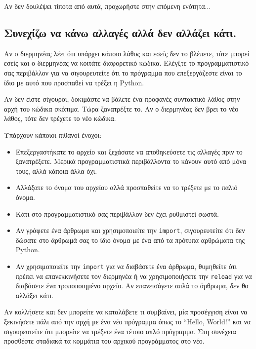 \documentclass[10pt]{book}
\begin{document}
Αν δεν δουλέψει τίποτα από αυτά, προχωρήστε στην επόμενη ενότητα...


\subsection{Συνεχίζω να κάνω αλλαγές αλλά δεν αλλάζει κάτι.}

Αν ο διερμηνέας λέει ότι υπάρχει κάποιο λάθος και εσείς δεν το βλέπετε, τότε μπορεί εσείς και 
ο διερμηνέας να κοιτάτε διαφορετικό κώδικα.  Ελέγξτε το προγραμματιστικό σας περιβάλλον για να
σιγουρευτείτε ότι το πρόγραμμα που επεξεργάζεστε είναι το ίδιο με αυτό που προσπαθεί να τρέξει 
η Python.

Αν δεν είστε σίγουροι, δοκιμάστε να βάλετε ένα προφανές συντακτικό λάθος στην αρχή του 
κώδικα σκόπιμα.  Τώρα ξανατρέξτε το.  Αν ο διερμηνέας δεν βρει το νέο λάθος, τότε δεν τρέχετε 
το νέο κώδικα.

Υπάρχουν κάποιοι πιθανοί ένοχοι:

\begin{itemize}

\item  Επεξεργαστήκατε το αρχείο και ξεχάσατε να αποθηκεύσετε τις αλλαγές πριν το ξανατρέξετε.
Μερικά προγραμματιστικά περιβάλλοντα το κάνουν αυτό από μόνα τους, αλλά κάποια άλλα όχι. 

\item  Αλλάξατε το όνομα του αρχείου αλλά προσπαθείτε να το τρέξετε με το παλιό όνομα. 

\item  Κάτι στο προγραμματιστικό σας περιβάλλον δεν έχει ρυθμιστεί σωστά. 

\item  Αν γράφετε ένα άρθρωμα και χρησιμοποιείτε την {\tt import}, σιγουρευτείτε 
ότι δεν δώσατε στο άρθρωμά σας το ίδιο όνομα με ένα από τα πρότυπα αρθρώματα της Python.

\item  Αν χρησιμοποιείτε την {\tt import} για να διαβάσετε ένα άρθρωμα, θυμηθείτε 
ότι πρέπει να επανεκκινήσετε τον διερμηνέα ή να χρησιμοποιήσετε την {\tt reload} για να 
διαβάσετε ένα τροποποιημένο αρχείο.  Αν επανεισάγετε απλά το άρθρωμα, δεν θα αλλάξει κάτι. 

\end{itemize}

Αν κολλήσετε και δεν μπορείτε να καταλάβετε τι συμβαίνει, μία προσέγγιση είναι να ξεκινήσετε πάλι
από την αρχή με ένα νέο πρόγραμμα όπως το ``Hello, World!'' και να σιγουρευτείτε ότι μπορείτε να
τρέξετε ένα τέτοιο απλό πρόγραμμα. Στη συνέχεια προσθέστε σταδιακά τα κομμάτια του αρχικού προγράμματος στο νέο.
\end{document}
